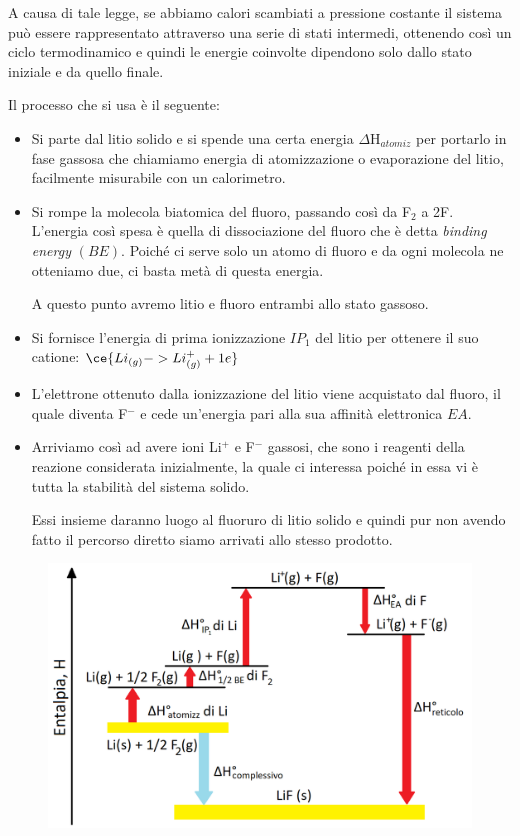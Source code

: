 \vspace{0.2cm}A causa di tale legge, se abbiamo calori scambiati a pressione costante il sistema può essere rappresentato attraverso una serie di stati intermedi, ottenendo così un ciclo termodinamico e quindi le energie coinvolte dipendono solo dallo stato iniziale e da quello finale.

\vspace{0.2cm}Il processo che si usa è il seguente:
\begin{itemize}
    \item Si parte dal litio solido e si spende una certa energia $\Delta\text{H}_{atomiz}$ per portarlo in fase gassosa che chiamiamo energia di atomizzazione o evaporazione del litio, facilmente misurabile con un calorimetro.
    \item Si rompe la molecola biatomica del fluoro, passando così da F$_2$ a 2F. L'energia così spesa è quella di dissociazione del fluoro che è detta \textit{binding energy} $(BE)$. Poiché ci serve solo un atomo di fluoro e da ogni molecola ne otteniamo due, ci basta metà di questa energia.
    
    A questo punto avremo litio e fluoro entrambi allo stato gassoso.
    \item Si fornisce l'energia di prima ionizzazione $IP_1$ del litio per ottenere il suo catione: $\ce{Li_{(g)} -> Li^{+}_{(g)} + 1e}$
    \item L'elettrone ottenuto dalla ionizzazione del litio viene acquistato dal fluoro, il quale diventa F$^-$ e cede un'energia pari alla sua affinità elettronica $EA$.
    \item Arriviamo così ad avere ioni Li$^+$ e F$^-$ gassosi, che sono i reagenti della reazione considerata inizialmente, la quale ci interessa poiché in essa vi è tutta la stabilità del sistema solido.
    
    Essi insieme daranno luogo al fluoruro di litio solido e quindi pur non avendo fatto il percorso diretto siamo arrivati allo stesso prodotto.
\end{itemize}

\vspace{-0.4cm}\begin{figure}[H]
    \centering
    \includegraphics[width=12cm]{immagini/Ciclo-Born-Haber.png}
\end{figure}

